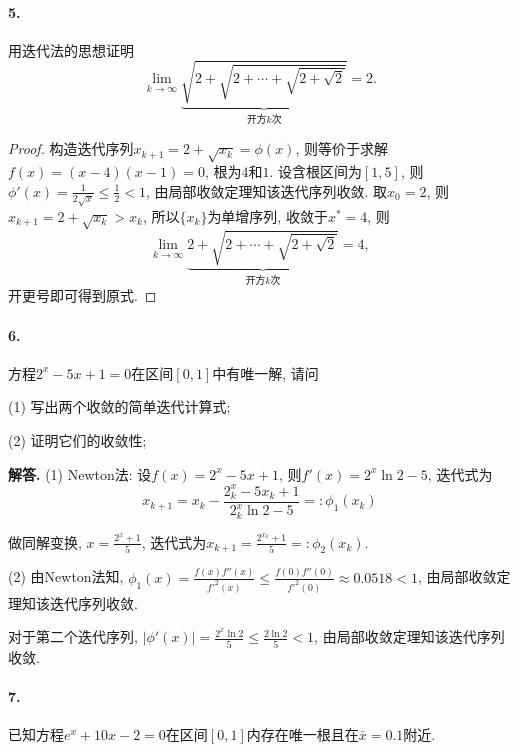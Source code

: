 \documentclass[12pt, a4paper, oneside]{ctexart}
\newenvironment{solution}{\par\noindent\textbf{解答. }}{\bigskip\par}
\def\disp{\displaystyle}
\def\add{\vspace{0.5ex}}  %
\begin{document}
\paragraph{5.}用迭代法的思想证明
\begin{equation*}
    \lim_{k\to \infty}\underbrace{\sqrt{2+\sqrt{2+\cdots+\sqrt{2+\sqrt{2}}}}}_{\text{开方}k\text{次}} = 2.
\end{equation*}
\begin{proof}
    构造迭代序列$x_{k+1} = 2+\sqrt{x_k} = \phi(x)$, 则等价于求解$f(x) = (x-4)(x-1)=0$, 根为$4$和$1$. 设含根区间为$[1, 5]$, 则$\disp \phi'(x) = \frac{1}{2\sqrt{x}}\leqslant \frac{1}{2} < 1$, 由局部收敛定理知该迭代序列收敛. 取$x_0 = 2$, 则$x_{k+1} = 2+\sqrt{x_k} > x_k$, 所以$\{x_k\}$为单增序列, 收敛于$x^* = 4$, 则
    \begin{equation*}
        \lim_{k\to \infty}\underbrace{2+\sqrt{2+\cdots+\sqrt{2+\sqrt{2}}}}_{\text{开方}k\text{次}} = 4,
    \end{equation*}
    开更号即可得到原式.
\end{proof}
\paragraph{6.}方程$2^x-5x+1=0$在区间$[0,1]$中有唯一解, 请问

(1) 写出两个收敛的简单迭代计算式;

(2) 证明它们的收敛性;

\begin{solution}
    (1) Newton法: 设$f(x) = 2^x-5x+1$, 则$f'(x) = 2^x\ln2-5$, 迭代式为
    \begin{equation*}
        \disp x_{k+1} = x_k-\frac{2^x_k-5x_k+1}{2^x_k\ln2-5}=: \phi_1(x_k)
    \end{equation*}

    做同解变换, $\disp x = \frac{2^x+1}{5}$, 迭代式为$\disp x_{k+1} = \frac{2^{x_k}+1}{5}=:\phi_2(x_k)$.\add

    (2) 由Newton法知, $\disp \phi_1(x) = \frac{f(x)f''(x)}{f'^2(x)} \leqslant \frac{f(0)f''(0)}{f'^2(0)} \approx 0.0518 < 1$, 由局部收敛定理知该迭代序列收敛. 
    
    对于第二个迭代序列, $\disp |\phi'(x)| = \frac{2^x\ln 2}{5}\leqslant \frac{2\ln 2}{5} < 1$, 由局部收敛定理知该迭代序列收敛.
\end{solution}

\paragraph{7.}已知方程$e^x+10x-2=0$在区间$[0,1]$内存在唯一根且在$\bar{x}=0.1$附近.
\end{document}
